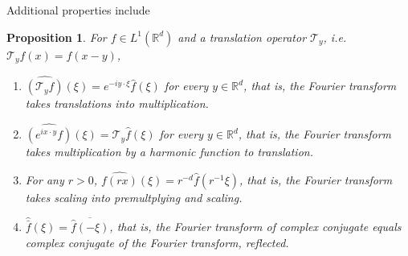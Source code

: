 \documentclass[letterpaper,twoside,12pt]{article}
\theoremstyle{mystyle}
\newtheorem{prop}{Proposition}[section]
\newcommand{\R}{{\mathbb R}}
\begin{document}
Additional properties include
\begin{prop}
  For $f\in L^1\left( \R^d \right)$ and a translation operator $\mathcal T_y$, i.e. $\mathcal T_yf \left( x \right) = f\left( x-y \right)$, 
  \begin{enumerate}
    \item $\widehat {\left( {{\mathcal{T}_y}f} \right)}\left( \xi  \right) = {e^{ - iy \cdot \xi }}\hat f\left( \xi  \right)$ for every $y \in \R^d$, that is, the Fourier transform takes translations into multiplication. 
    \item $\widehat {\left( {{e^{ix \cdot y}}f} \right)}\left( \xi  \right) = {\mathcal{T}_y}\hat f\left( \xi  \right)$ for every $y \in \R^d$, that is, the Fourier transform takes multiplication by a harmonic function to translation.
    \item For any $r>0$, $\widehat {f\left( {rx} \right)}\left( \xi  \right) = {r^{ - d}}\hat f\left( {{r^{ - 1}}\xi } \right)$, that is, the Fourier transform takes scaling into premultplying and scaling. 
    \item $\widehat {\bar f}\left( \xi  \right) = \overline {\hat f\left( { - \xi } \right)} $, that is, the Fourier transform of complex conjugate equals complex conjugate of the Fourier transform, reflected. 
  \end{enumerate} 
\end{prop}
\end{document}
